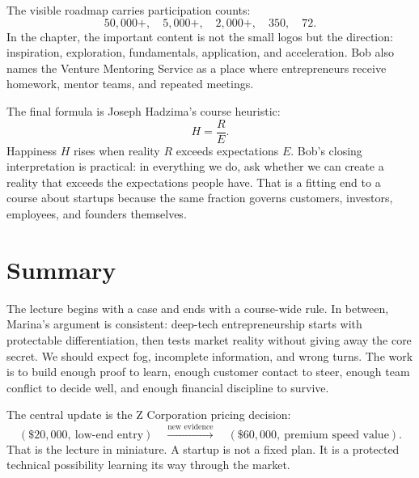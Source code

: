 The visible roadmap carries participation counts:
\begin{equation}
50{,}000+,\quad 5{,}000+,\quad 2{,}000+,\quad 350,\quad 72.
\end{equation}
In the chapter, the important content is not the small logos but the direction: inspiration, exploration, fundamentals, application, and acceleration. Bob also names the Venture Mentoring Service as a place where entrepreneurs receive homework, mentor teams, and repeated meetings.

The final formula is Joseph Hadzima's course heuristic:
\begin{equation}
H=\frac{R}{E}.
\end{equation}
Happiness \(H\) rises when reality \(R\) exceeds expectations \(E\). Bob's closing interpretation is practical: in everything we do, ask whether we can create a reality that exceeds the expectations people have. That is a fitting end to a course about startups because the same fraction governs customers, investors, employees, and founders themselves.

\section{Summary}

The lecture begins with a case and ends with a course-wide rule. In between, Marina's argument is consistent: deep-tech entrepreneurship starts with protectable differentiation, then tests market reality without giving away the core secret. We should expect fog, incomplete information, and wrong turns. The work is to build enough proof to learn, enough customer contact to steer, enough team conflict to decide well, and enough financial discipline to survive.

The central update is the Z Corporation pricing decision:
\begin{equation}
(\$20{,}000,\ \text{low-end entry})
\quad\stackrel{\text{new evidence}}{\longrightarrow}\quad
(\$60{,}000,\ \text{premium speed value}).
\end{equation}
That is the lecture in miniature. A startup is not a fixed plan. It is a protected technical possibility learning its way through the market.